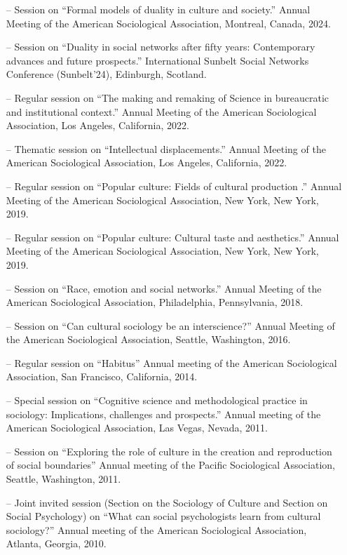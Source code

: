 
\begin{itemize}[itemsep=-0.5ex]
    \item[--] Session on ``Formal models of duality in culture and society.'' Annual Meeting of the American Sociological Association, Montreal, Canada, 2024.
    \item[--] Session on ``Duality in social networks after fifty years: Contemporary advances and future prospects.'' International Sunbelt Social Networks Conference (Sunbelt'24), Edinburgh, Scotland.
    \item[--] Regular session on ``The making and remaking of Science in bureaucratic and institutional context.'' Annual Meeting of the American Sociological Association, Los Angeles, California, 2022.
    \item[--] Thematic session on ``Intellectual displacements.'' Annual Meeting of the American Sociological Association, Los Angeles, California, 2022.
    \item[--] Regular session on ``Popular culture: Fields of cultural production .'' Annual Meeting of the American Sociological Association, New York, New York, 2019.
    \item[--] Regular session on ``Popular culture: Cultural taste and aesthetics.'' Annual Meeting of the American Sociological Association, New York, New York, 2019.
    \item[--] Session on ``Race, emotion and social networks.'' Annual Meeting of the American Sociological Association, Philadelphia, Pennsylvania, 2018.
    \item[--] Session on  ``Can cultural sociology be an interscience?'' Annual Meeting of the American Sociological Association, Seattle, Washington, 2016.
    \item[--] Regular session on ``Habitus''   Annual meeting of the American Sociological Association, San Francisco, California, 2014.
    \item[--] Special session on ``Cognitive science and methodological practice in sociology: Implications, challenges and prospects.''  Annual meeting of the American Sociological Association, Las Vegas, Nevada, 2011.
    \item[--] Session on ``Exploring the role of culture in the creation and reproduction of social boundaries'' Annual meeting of the Pacific Sociological Association, Seattle, Washington, 2011.
    \item[--] Joint invited session (Section on the Sociology of Culture and Section on Social Psychology) on ``What can social psychologists learn from cultural sociology?''   Annual meeting of the American Sociological Association, Atlanta, Georgia, 2010.

\end{itemize}
